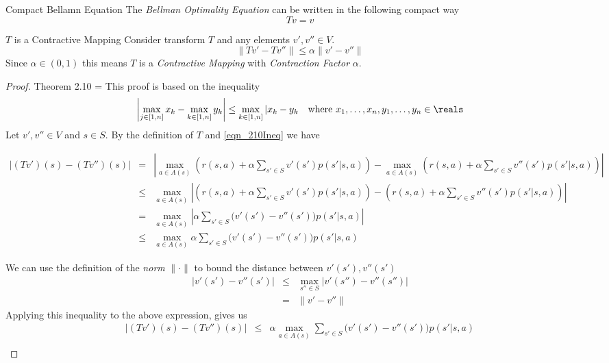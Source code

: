 \documentclass[11pt,a4paper]{article}
\begin{document}
  \begin{remark}{Compact Bellamn Equation}
    The \textit{Bellman Optimality Equation} can be written in the following compact way
    \[ Tv=v \]
  \end{remark}

  \begin{theorem}{$T$ is a Contractive Mapping}
    Consider transform $T$ and any elements $v',v''\in V$.
    \[ \|Tv'-Tv''\|\leq\alpha\|v'-v''\| \]
    Since $\alpha\in(0,1)$ this means $T$ is a \textit{Contractive Mapping} with \textit{Contraction Factor} $\alpha$.
  \end{theorem}

  \begin{proof}{Theorem 2.10}
    \everymath={\displaystyle}
    This proof is based on the inequality
    \begin{equation}
      \left|\max_{j\in[1,n]}x_k-\max_{k\in[1,n]}y_k\right|\leq\max_{k\in[1,n]}|x_k-y_k\quad\text{where }x_1,\dots,x_n,y_1,\dots,y_n\in\reals
      \label{eqn_210Ineq}
    \end{equation}
    Let $v',v''\in V$ and $s\in S$. By the definition of $T$ and \ref{eqn_210Ineq} we have
    \begin{adjustwidth}{-2cm}{}
      \[\begin{array}{rcl}
      |(Tv')(s)-(Tv'')(s)|&=&\left|\max_{a\in A(s)}\left(r(s,a)+\alpha\sum_{s'\in S}v'(s')p(s'|s,a)\right)-\max_{a\in A(s)}\left(r(s,a)+\alpha\sum_{s'\in S}v''(s')p(s'|s,a)\right)\right|\\
      &\leq&\max_{a\in A(s)}\left|\left(r(s,a)+\alpha\sum_{s'\in S}v'(s')p(s'|s,a)\right)-\left(r(s,a)+\alpha\sum_{s'\in S}v''(s')p(s'|s,a)\right)\right|\\
      &=&\max_{a\in A(s)}\left|\alpha\sum_{s'\in S}\big(v'(s')-v''(s')\big)p(s'|s,a)\right|\\
      &\leq&\max_{a\in A(s)}\alpha\sum_{s'\in S}\big(v'(s')-v''(s')\big)p(s'|s,a)
      \end{array}\]
    \end{adjustwidth}
    We can use the definition of the \textit{norm} $\|\cdot\|$ to bound the distance between $v'(s'),v''(s')$
    \[\begin{array}{rcl}
      |v'(s')-v''(s')|&\leq&\max_{s''\in S}|v'(s'')-v''(s'')|\\
      &=&\|v'-v''\|
    \end{array}\]
    Applying this inequality to the above expression, gives us
    \[\begin{array}{rcl}
      |(Tv')(s)-(Tv'')(s)|&\leq&\alpha\max_{a\in A(s)}\sum_{s'\in S}\big(v'(s')-v''(s')\big)p(s'|s,a)\\

\end{array}\]
\end{proof}
\end{document}
